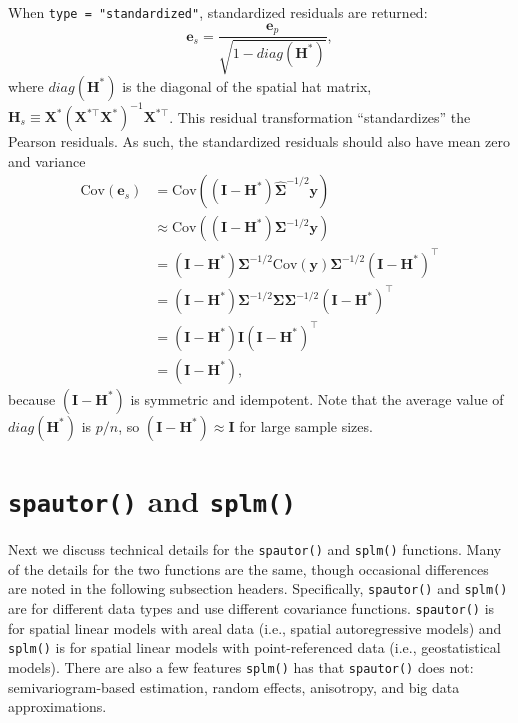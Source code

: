 \documentclass[10pt,letterpaper]{article}
\begin{document}
When \texttt{type\ =\ "standardized"}, standardized residuals are
returned: \begin{equation*}
 \mathbf{e}_{s} = \frac{\mathbf{e}_{p}}{\sqrt{1 - diag(\mathbf{H}^*)}},
\end{equation*} where \(diag(\mathbf{H}^*)\) is the diagonal of the
spatial hat matrix,
\(\mathbf{H}_s \equiv \mathbf{X}^* (\mathbf{X}^{* \top} \mathbf{X}^*)^{-1} \mathbf{X}^{* \top}\).
This residual transformation ``standardizes'' the Pearson residuals. As
such, the standardized residuals should also have mean zero and variance
\begin{equation*}
  \begin{split}
  \text{Cov}(\mathbf{e}_{s}) & = \text{Cov}((\mathbf{I} - \mathbf{H}^*) \hat{\boldsymbol{\Sigma}}^{-1/2}\mathbf{y}) \\
  & \approx \text{Cov}((\mathbf{I} - \mathbf{H}^*) \boldsymbol{\Sigma}^{-1/2}\mathbf{y}) \\
  & = (\mathbf{I} - \mathbf{H}^*) \boldsymbol{\Sigma}^{-1/2} \text{Cov}(\mathbf{y}) \boldsymbol{\Sigma}^{-1/2}(\mathbf{I} - \mathbf{H}^*)^\top \\
  & = (\mathbf{I} - \mathbf{H}^*) \boldsymbol{\Sigma}^{-1/2} \boldsymbol{\Sigma} \boldsymbol{\Sigma}^{-1/2}(\mathbf{I} - \mathbf{H}^*)^\top \\
  & = (\mathbf{I} - \mathbf{H}^*) \mathbf{I} (\mathbf{I} - \mathbf{H}^*)^\top \\
  & = (\mathbf{I} - \mathbf{H}^*),
  \end{split}
\end{equation*} because \((\mathbf{I} - \mathbf{H}^*)\) is symmetric and
idempotent. Note that the average value of \(diag(\mathbf{H}^*)\) is
\(p / n\), so \((\mathbf{I} - \mathbf{H}^*) \approx \mathbf{I}\) for
large sample sizes.

\hypertarget{sec:spmod}{%
\section{\texorpdfstring{\texttt{spautor()} and
\texttt{splm()}}{spautor() and splm()}}\label{sec:spmod}}

Next we discuss technical details for the \texttt{spautor()} and
\texttt{splm()} functions. Many of the details for the two functions are
the same, though occasional differences are noted in the following
subsection headers. Specifically, \texttt{spautor()} and \texttt{splm()}
are for different data types and use different covariance functions.
\texttt{spautor()} is for spatial linear models with areal data (i.e.,
spatial autoregressive models) and \texttt{splm()} is for spatial linear
models with point-referenced data (i.e., geostatistical models). There
are also a few features \texttt{splm()} has that \texttt{spautor()} does
not: semivariogram-based estimation, random effects, anisotropy, and big
data approximations.
\end{document}
